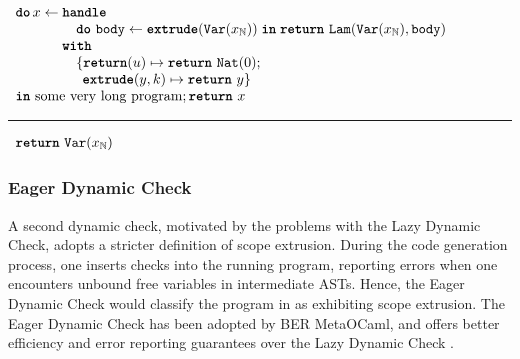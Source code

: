 \begin{code}
  \begin{efflst}
    $\begin{array}{l}
      \textbf{\texttt{do}} \,  x \leftarrow \textbf{\texttt{handle}} \\
      \quad \quad \quad \quad \,\, \texttt{\textbf{do}} \,\, {\texttt{body}} \leftarrow {\textbf{\texttt{extrude}}({\texttt{Var}(x_{\mathbb{N}})})} \; \textbf{\texttt{in}} \; {\texttt{\textbf{return}} \,\, {\texttt{Lam}(\texttt{Var}(x_{\mathbb{N}}), \texttt{body})}} \\
      \quad \quad \quad \,\, \textbf{\texttt{with}} \\
      \quad \quad \quad \quad \, \, \{ \textbf{\texttt{return}}(u) \mapsto {\texttt{\textbf{return}} \,\, {\texttt{Nat}(0)}}; \\
      \quad \quad \quad \quad \, \, \; \, \textbf{\texttt{extrude}}(y, k) \mapsto {\texttt{\textbf{return}} \,\, {y}}\}\\
      \textbf{\texttt{in}} \text{ some very long program}; \texttt{\textbf{return}} \,\, {x}
    \end{array}$

    \vspace{2mm} 
\textcolor{effComment}{\hrule height 0.2mm \relax}
\vspace{2mm} 

\textcolor{effComment}{$\begin{array}{l}\texttt{\textbf{return}} \,\, {\texttt{Var}(x_{\mathbb{N}})}\end{array}$}

\end{efflst}
%
\label{listing:efflang-lazy-scope-extrusion-inefficient}
\end{code}

\subsubsection{Eager Dynamic Check}\label{subsubsection:eager-dynamic-check}
A second dynamic check, motivated by the problems with the Lazy Dynamic Check, adopts a stricter definition of scope extrusion. During the code generation process, one inserts checks into the running program, reporting errors when one encounters  unbound free variables in intermediate ASTs. Hence, the Eager Dynamic Check would classify the program in  as exhibiting scope extrusion. The Eager Dynamic Check has been adopted by BER MetaOCaml, and offers better efficiency and error reporting guarantees over the Lazy Dynamic Check \citep{kiselyov-14}.

